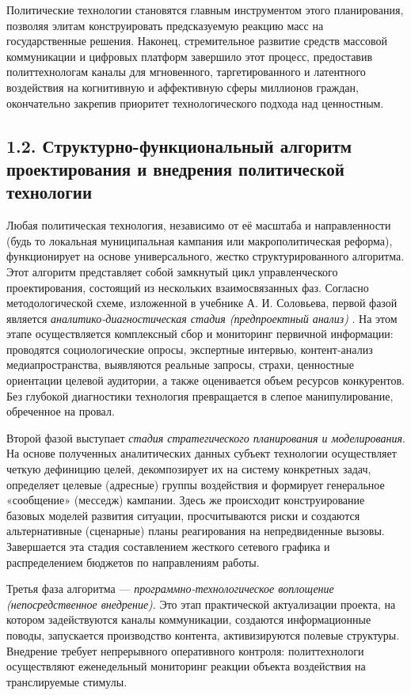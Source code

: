 Политические технологии становятся главным инструментом этого планирования, позволяя элитам конструировать предсказуемую реакцию масс на государственные решения. Наконец, стремительное развитие средств массовой коммуникации и цифровых платформ завершило этот процесс, предоставив политтехнологам каналы для мгновенного, таргетированного и латентного воздействия на когнитивную и аффективную сферы миллионов граждан, окончательно закрепив приоритет технологического подхода над ценностным.

\subsection{1.2. Структурно-функциональный алгоритм проектирования и внедрения политической технологии}

Любая политическая технология, независимо от её масштаба и направленности (будь то локальная муниципальная кампания или макрополитическая реформа), функционирует на основе универсального, жестко структурированного алгоритма. Этот алгоритм представляет собой замкнутый цикл управленческого проектирования, состоящий из нескольких взаимосвязанных фаз. Согласно методологической схеме, изложенной в учебнике А. И. Соловьева, первой фазой является \textit{аналитико-диагностическая стадия (предпроектный анализ)} \cite{Solovyev}. На этом этапе осуществляется комплексный сбор и мониторинг первичной информации: проводятся социологические опросы, экспертные интервью, контент-анализ медиапространства, выявляются реальные запросы, страхи, ценностные ориентации целевой аудитории, а также оценивается объем ресурсов конкурентов. Без глубокой диагностики технология превращается в слепое манипулирование, обреченное на провал.

Второй фазой выступает \textit{стадия стратегического планирования и моделирования}. На основе полученных аналитических данных субъект технологии осуществляет четкую дефиницию целей, декомпозирует их на систему конкретных задач, определяет целевые (адресные) группы воздействия и формирует генеральное «сообщение» (месседж) кампании. Здесь же происходит конструирование базовых моделей развития ситуации, просчитываются риски и создаются альтернативные (сценарные) планы реагирования на непредвиденные вызовы. Завершается эта стадия составлением жесткого сетевого графика и распределением бюджетов по направлениям работы.

Третья фаза алгоритма — \textit{программно-технологическое воплощение (непосредственное внедрение)}. Это этап практической актуализации проекта, на котором задействуются каналы коммуникации, создаются информационные поводы, запускается производство контента, активизируются полевые структуры. Внедрение требует непрерывного оперативного контроля: политтехнологи осуществляют еженедельный мониторинг реакции объекта воздействия на транслируемые стимулы. 

